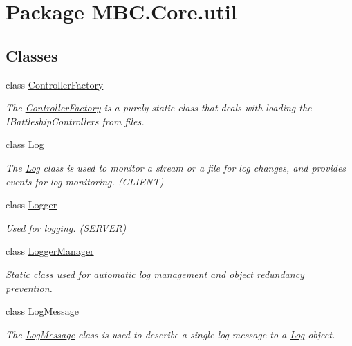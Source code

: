 \hypertarget{namespace_m_b_c_1_1_core_1_1util}{\section{Package M\-B\-C.\-Core.\-util}
\label{namespace_m_b_c_1_1_core_1_1util}
}
\subsection*{Classes}
\begin{DoxyCompactItemize}
\item 
class \hyperlink{class_m_b_c_1_1_core_1_1util_1_1_controller_factory}{Controller\-Factory}
\begin{DoxyCompactList}\small\item\em The \hyperlink{class_m_b_c_1_1_core_1_1util_1_1_controller_factory}{Controller\-Factory} is a purely static class that deals with loading the I\-Battleship\-Controllers from files. \end{DoxyCompactList}\item 
class \hyperlink{class_m_b_c_1_1_core_1_1util_1_1_log}{Log}
\begin{DoxyCompactList}\small\item\em The \hyperlink{class_m_b_c_1_1_core_1_1util_1_1_log}{Log} class is used to monitor a stream or a file for log changes, and provides events for log monitoring. (C\-L\-I\-E\-N\-T)\end{DoxyCompactList}\item 
class \hyperlink{class_m_b_c_1_1_core_1_1util_1_1_logger}{Logger}
\begin{DoxyCompactList}\small\item\em Used for logging. (S\-E\-R\-V\-E\-R)\end{DoxyCompactList}\item 
class \hyperlink{class_m_b_c_1_1_core_1_1util_1_1_logger_manager}{Logger\-Manager}
\begin{DoxyCompactList}\small\item\em Static class used for automatic log management and object redundancy prevention.\end{DoxyCompactList}\item 
class \hyperlink{class_m_b_c_1_1_core_1_1util_1_1_log_message}{Log\-Message}
\begin{DoxyCompactList}\small\item\em The \hyperlink{class_m_b_c_1_1_core_1_1util_1_1_log_message}{Log\-Message} class is used to describe a single log message to a \hyperlink{class_m_b_c_1_1_core_1_1util_1_1_log}{Log} object.\end{DoxyCompactList}\end{DoxyCompactItemize}
